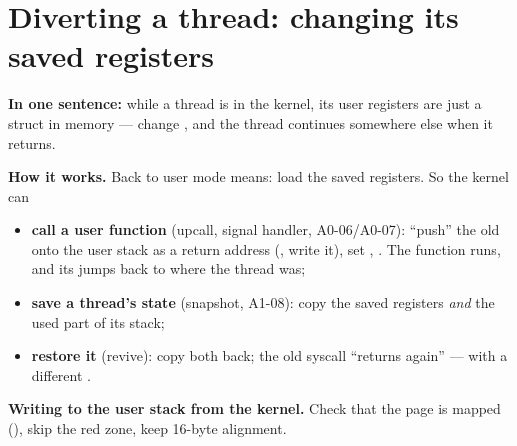\documentclass[11pt]{report}
\newcommand{\conceptsection}[1]{\section{#1}}
\begin{document}
\conceptsection{Diverting a thread: changing its saved registers}
\label{c:divert}

\textbf{In one sentence:} while a thread is in the kernel, its user registers are just a struct in
memory --- change , and the thread continues somewhere else when it returns.

\textbf{How it works.} Back to user mode means: load the saved registers. So the kernel can
\begin{itemize}
\item \textbf{call a user function} (upcall, signal handler, A0-06/A0-07): ``push'' the old
   onto the user stack as a return address (, write it), set
  , . The function runs, and its  jumps back to
  where the thread was;
\item \textbf{save a thread's state} (snapshot, A1-08): copy the saved registers \emph{and} the used
  part of its stack;
\item \textbf{restore it} (revive): copy both back; the old syscall ``returns again'' --- with a
  different .
\end{itemize}

\textbf{Writing to the user stack from the kernel.} Check that the page is mapped
(), skip the red zone, keep 16-byte alignment.
\end{document}
